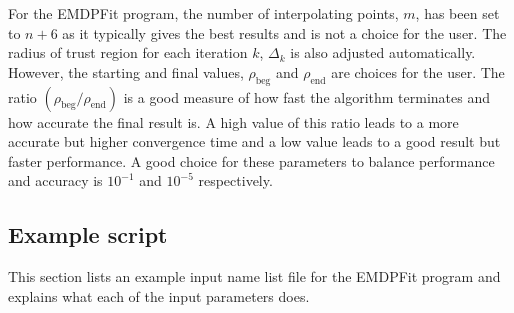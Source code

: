 \documentclass[DIV=calc, paper=letter, fontsize=11pt]{scrartcl}	 %
\newcommand{\ctp}{\textsf{EMsoft}}
\begin{document}
\noindent For the \textsf{EMDPFit} program, the number of interpolating points, $m$, has been set to $n+6$ as it typically gives the best results and is not a choice for the user. The radius of trust region for each iteration $k$, $\Delta_{k}$ is also adjusted automatically. However, the starting and final values, $\rho_{\textrm{beg}}$ and $\rho_{\textrm{end}}$ are choices for the user. The ratio $(\rho_{\textrm{beg}}/\rho_{\textrm{end}})$ is a good measure of how fast the algorithm terminates and how accurate the final result is. A high value of this ratio leads to a more accurate but higher convergence time and a low value leads to a good result but faster performance. A good choice for these parameters to balance performance and accuracy is $10^{-1}$ and $10^{-5}$ respectively.
\subsection{Example script}
This section lists an example input name list file for the \textsf{EMDPFit} program and explains what each of the input parameters does.


\end{document}
